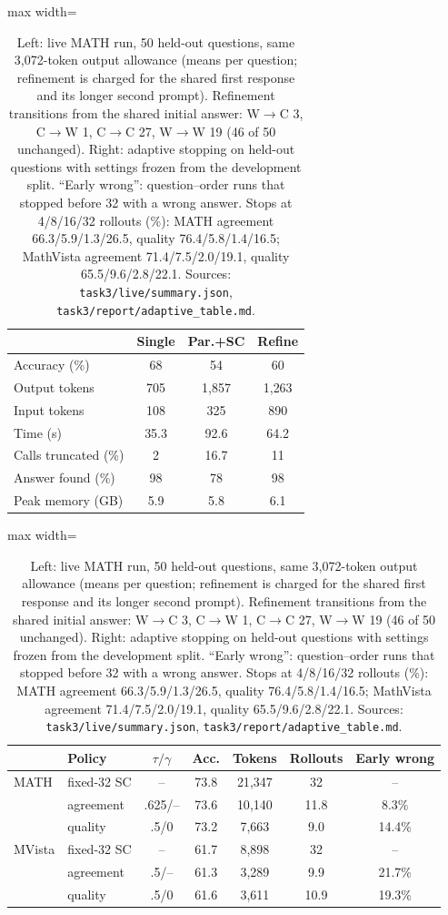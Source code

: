 \documentclass{article}
\begin{document}
\begin{table}[t]\centering\footnotesize\setlength{\tabcolsep}{3pt}
\begin{minipage}[t]{.38\linewidth}\centering\vspace{0pt}
\begin{adjustbox}{max width=\linewidth}\begin{tabular}{lccc}\toprule
 & Single & Par.+SC & Refine \\\midrule
Accuracy (\%)          & 68 & 54 & 60 \\
Output tokens          & 705 & 1{,}857 & 1{,}263 \\
Input tokens           & 108 & 325 & 890 \\
Time (s)               & 35.3 & 92.6 & 64.2 \\
Calls truncated (\%)   & 2 & 16.7 & 11 \\
Answer found (\%)      & 98 & 78 & 98 \\
Peak memory (GB)       & 5.9 & 5.8 & 6.1 \\\bottomrule
\end{tabular}\end{adjustbox}
\end{minipage}\hfill
\begin{minipage}[t]{.58\linewidth}\centering\vspace{0pt}
\begin{adjustbox}{max width=\linewidth}\begin{tabular}{llccccc}\toprule
 & Policy & $\tau/\gamma$ & Acc. & Tokens & Rollouts & Early wrong \\\midrule
MATH & fixed-32 SC & -- & 73.8 & 21{,}347 & 32 & -- \\
     & agreement & .625/-- & 73.6 & 10{,}140 & 11.8 & 8.3\% \\
     & quality & .5/0 & 73.2 & 7{,}663 & 9.0 & 14.4\% \\\midrule
MVista & fixed-32 SC & -- & 61.7 & 8{,}898 & 32 & -- \\
     & agreement & .5/-- & 61.3 & 3{,}289 & 9.9 & 21.7\% \\
     & quality & .5/0 & 61.6 & 3{,}611 & 10.9 & 19.3\% \\\bottomrule
\end{tabular}\end{adjustbox}
\end{minipage}
\caption{Left: live MATH run, 50 held-out questions, same 3{,}072-token output allowance (means per question; refinement is charged for the shared first response and its longer second prompt). Refinement transitions from the shared initial answer: W$\to$C 3, C$\to$W 1, C$\to$C 27, W$\to$W 19 (46 of 50 unchanged). Right: adaptive stopping on held-out questions with settings frozen from the development split. ``Early wrong'': question--order runs that stopped before 32 with a wrong answer. Stops at 4/8/16/32 rollouts (\%): MATH agreement 66.3/5.9/1.3/26.5, quality 76.4/5.8/1.4/16.5; MathVista agreement 71.4/7.5/2.0/19.1, quality 65.5/9.6/2.8/22.1. Sources: \texttt{task3/live/summary.json}, \texttt{task3/report/adaptive\_table.md}.}\label{tab:t3live}
\end{table}
\end{document}
